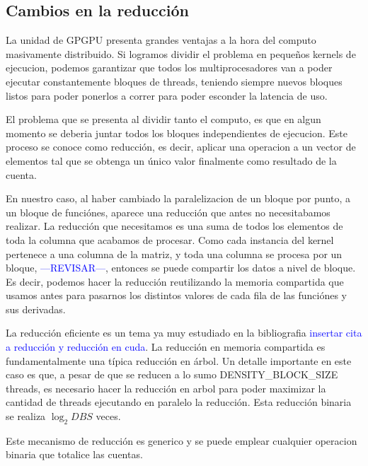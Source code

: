 
\subsection{Cambios en la reducci\'on}

La unidad de GPGPU presenta grandes ventajas a la hora del computo masivamente distribuido.
Si logramos dividir el problema en pequeños kernels de ejecucion, podemos garantizar que
todos los multiprocesadores van a poder ejecutar constantemente bloques de threads, teniendo
siempre nuevos bloques listos para poder ponerlos a correr para poder esconder la latencia de uso.

El problema que se presenta al dividir tanto el computo, es que en algun momento se deberia juntar
todos los bloques independientes de ejecucion. Este proceso se conoce como reducci\'on, es decir,
aplicar una operacion a un vector de elementos tal que se obtenga un \'unico valor finalmente
como resultado de la cuenta.

En nuestro caso, al haber cambiado la paralelizacion de un bloque por punto, a un bloque
de funci\'ones, aparece una reducci\'on que antes no necesitabamos realizar. La reducci\'on que
necesitamos es una suma de todos los elementos de toda la columna que acabamos de procesar.
Como cada instancia del kernel pertenece a una columna de la matriz, y toda una columna se
procesa por un bloque, \textcolor{blue}{---REVISAR---}, entonces se puede compartir los datos
a nivel de bloque. Es decir, podemos hacer la reducci\'on reutilizando la memoria compartida
que usamos antes para pasarnos los distintos valores de cada fila de las funci\'ones y sus derivadas.

La reducci\'on eficiente es un tema ya muy estudiado en la bibliografia \textcolor{blue}{insertar cita a
reducci\'on y reducci\'on en cuda}. La reducci\'on en memoria compartida es fundamentalmente
una t\'ipica reducci\'on en \'arbol. Un detalle importante en este caso es que, a pesar de que
se reducen a lo sumo DENSITY\_BLOCK\_SIZE threads, es necesario hacer la reducci\'on en arbol
para poder maximizar la cantidad de threads ejecutando en paralelo la reducci\'on. Esta reducci\'on
binaria se realiza $\log_2{DBS}$ veces.

Este mecanismo de reducci\'on es generico y se puede emplear cualquier operacion binaria que
totalice las cuentas.



